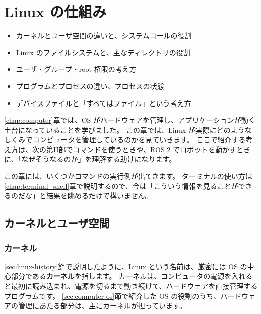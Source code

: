 \chapter{Linux の仕組み}
\label{chap:linux_internals}

\begin{goalbox}
  \begin{itemize}
    \item カーネルとユーザ空間の違いと、システムコールの役割
    \item Linux のファイルシステムと、主なディレクトリの役割
    \item ユーザ・グループ・root 権限の考え方
    \item プログラムとプロセスの違い、プロセスの状態
    \item デバイスファイルと「すべてはファイル」という考え方
  \end{itemize}
\end{goalbox}

\ref{chap:computer}章では、OS がハードウェアを管理し、アプリケーションが動く土台になっていることを学びました。
この章では、Linux が実際にどのようなしくみでコンピュータを管理しているのかを見ていきます。
ここで紹介する考え方は、次の第II部でコマンドを使うときや、ROS 2 でロボットを動かすときに、「なぜそうなるのか」を理解する助けになります。

\begin{point}[この章のコマンド例について]
  この章には、いくつかコマンドの実行例が出てきます。
  ターミナルの使い方は\ref{chap:terminal_shell}章で説明するので、今は「こういう情報を見ることができるのだな」と結果を眺めるだけで構いません。
\end{point}

\section{カーネルとユーザ空間}
\label{sec:linux-internals-kernel}

\subsection{カーネル}

\ref{sec:linux-history}節で説明したように、Linux という名前は、厳密には OS の中心部分である\textbf{カーネル}を指します。
カーネルは、コンピュータの電源を入れると最初に読み込まれ、電源を切るまで動き続けて、ハードウェアを直接管理するプログラムです。
\ref{sec:computer-os}節で紹介した OS の役割のうち、ハードウェアの管理にあたる部分は、主にカーネルが担っています。

